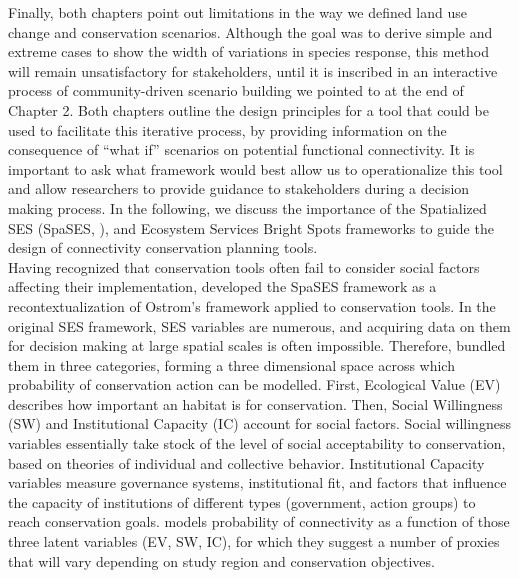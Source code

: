 \documentclass[12pt,Bold,TexShade]{thesis/mcgilletdclass}
\begin{document}
{Finally, both chapters point out limitations in the way we defined land use change and conservation scenarios. Although the goal was to derive simple and extreme cases to show the width of variations in species response, this method will remain unsatisfactory for stakeholders, until it is inscribed in an interactive process of community-driven scenario building we pointed to at the end of Chapter 2. Both chapters outline the design principles for a tool that could be used to facilitate this iterative process, by providing information on the consequence of “what if” scenarios on potential functional connectivity. It is important to ask what framework would best allow us to operationalize this tool and allow researchers to provide guidance to stakeholders during a decision making process. In the following, we discuss the importance of the Spatialized SES (SpaSES, \cite{williamson_spatially_2018}), and Ecosystem Services Bright Spots \citep{frei_bright_2018} frameworks to guide the design of connectivity conservation planning tools. \\

Having recognized that conservation tools often fail to consider social factors affecting their implementation, \cite{williamson_spatially_2018} developed the SpaSES framework as a recontextualization of Ostrom’s framework applied to conservation tools. In the original SES framework, SES variables are numerous, and acquiring data on them for decision making at large spatial scales is often impossible. Therefore, \citeauthor{williamson_spatially_2018} bundled them in three categories, forming a three dimensional space across which probability of conservation action can be modelled. First, Ecological Value (EV) describes how important an habitat is for conservation. Then, Social Willingness (SW) and Institutional Capacity (IC) account for social factors. Social willingness variables essentially take stock of the level of social acceptability to conservation, based on theories of individual and collective behavior. Institutional Capacity variables measure governance systems, institutional fit, and factors that influence the capacity of institutions of different types (government, action groups) to reach conservation goals. \citeauthor{williamson_spatially_2018} models probability of connectivity as a function of those three latent variables (EV, SW, IC), for which they suggest a number of proxies that will vary depending on study region and conservation objectives. \\

}
\end{document}
